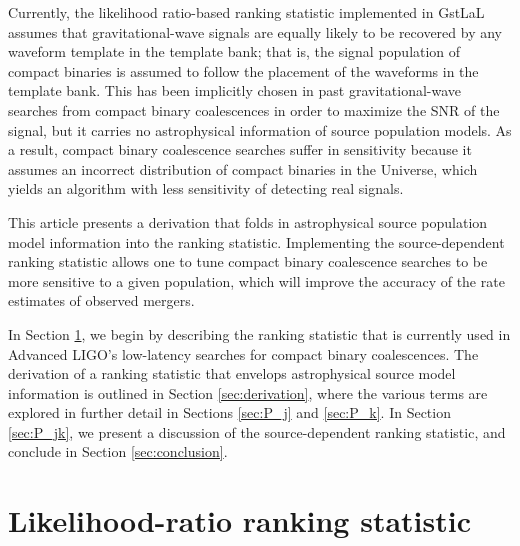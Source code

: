 \documentclass[twocolumn,showpacs,unsortedaddress,superscriptaddress,showkeys,nofootinbib,preprintnumbers,letterpaper]{revtex4-1}
\begin{document}
Currently, the likelihood ratio-based ranking statistic implemented in GstLaL assumes that gravitational-wave signals are equally likely to be recovered by any waveform template in the template bank; that is, the signal population of compact binaries is assumed to follow the placement of the waveforms in the template bank. This has been implicitly chosen in past gravitational-wave searches from compact binary coalescences in order to maximize the SNR of the signal, but it carries no astrophysical information of source population models. As a result, compact binary coalescence searches suffer in sensitivity because it assumes an incorrect distribution of compact binaries in the Universe, which yields an algorithm with less sensitivity of detecting real signals. 

This article presents a derivation that folds in astrophysical source population model information into the ranking statistic. Implementing the source-dependent ranking statistic allows one to tune compact binary coalescence searches to be more sensitive to a given population, which will improve the accuracy of the rate estimates of observed mergers. 

In Section \ref{sec:rankingstat}, we begin by describing the ranking statistic that is currently used in Advanced LIGO's low-latency searches for compact binary coalescences. The derivation of a ranking statistic that envelops astrophysical source model information is outlined in Section \ref{sec:derivation}, where the various terms are explored in further detail in Sections \ref{sec:P_j} and \ref{sec:P_k}. In Section \ref{sec:P_jk}, we present a discussion of the source-dependent ranking statistic, and conclude in Section \ref{sec:conclusion}.


\section{Likelihood-ratio ranking statistic} \label{sec:rankingstat}
\end{document}
